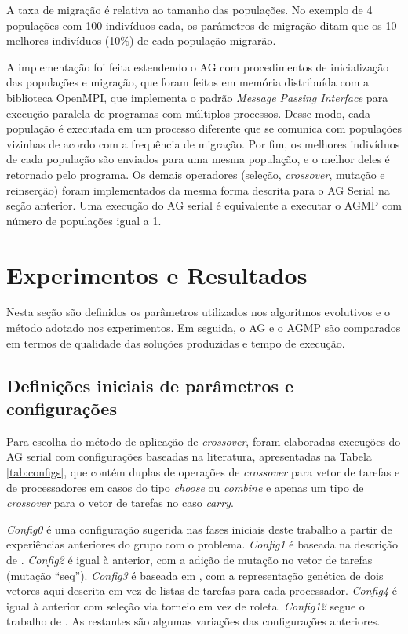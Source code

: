 \documentclass[fleqn,10pt]{SelfArx} %
\begin{document}
A taxa de migração é relativa ao tamanho das populações. No exemplo de 4 populações com 100 indivíduos cada, os parâmetros de migração ditam que os 10 melhores indivíduos (10\%) de cada população migrarão.

A implementação foi feita estendendo o AG com procedimentos de inicialização das populações e migração, que foram feitos em memória distribuída com a biblioteca OpenMPI, que implementa o padrão \textit{Message Passing Interface} para execução paralela de programas com múltiplos processos. Desse modo, cada população é executada em um processo diferente que se comunica com populações vizinhas de acordo com a frequência de migração. Por fim, os melhores indivíduos de cada população são enviados para uma mesma população, e o melhor deles é retornado pelo programa. Os demais operadores (seleção, \textit{crossover}, mutação e reinserção) foram implementados  da mesma forma descrita para o AG Serial na seção anterior. Uma execução do AG serial é equivalente a executar o AGMP com número de populações igual a 1.

\section{Experimentos e Resultados}

Nesta seção são definidos os parâmetros utilizados nos algoritmos evolutivos e o método adotado nos experimentos. Em seguida, o AG e o AGMP são comparados em termos de qualidade das soluções produzidas e tempo de execução.

\subsection{Definições iniciais de parâmetros e configurações}
\label{sec:param}

Para escolha do método de aplicação de \textit{crossover}, foram elaboradas execuções do AG serial com configurações baseadas na literatura, apresentadas na Tabela \ref{tab:configs}, que contém duplas de operações de \textit{crossover} para vetor de tarefas e de processadores em casos do tipo \textit{choose} ou \textit{combine} e apenas um tipo de \textit{crossover} para o vetor de tarefas no caso \textit{carry}.

\textit{Config0} é uma configuração sugerida nas fases iniciais deste trabalho a partir de experiências anteriores do grupo com o problema. \textit{Config1} é baseada na descrição de \citeauthor{OMARA201013}. \textit{Config2} é igual à anterior, com a adição de mutação no vetor de tarefas (mutação ``seq''). \textit{Config3} é baseada em \cite{Correa}, com a representação genética de dois vetores aqui descrita em vez de listas de tarefas para cada processador. \textit{Config4} é igual à anterior com seleção via torneio em vez de roleta. \textit{Config12} segue o trabalho de \citeauthor{Morady}. As restantes são algumas variações das configurações anteriores.
\end{document}
